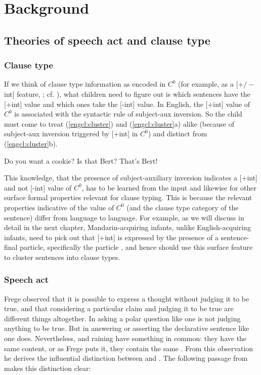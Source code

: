 \chapter{Background}
\label{chap:background}


\section{Theories of speech act and clause type} \label{sec:bg:theory}

\subsection{Clause type}
\label{sec:bg:clause}
If we think of clause type information as encoded in $C^{0}$ (for example, as a [$+/-$ int] feature,  \cite{chomskylasnik1977,rizzi1997}; cf. \cite{rizzi2001int}), what children need to figure out is which sentences have the [+int] value and which ones take the [-int] value. In English, the [+int] value of $C^{0}$ is associated with the syntactic rule of subject-aux inversion. So the child must come to treat (\ref{engcl:cluster}) and (\ref{engcl:cluster}a) alike (because of subject-aux inversion triggered by [+int] in $C^{0}$) and distinct from (\ref{engcl:cluster}b).%


Do you want a cookie?
\bxl{}
Is that Bert?
\ex
That’s Bert!
\exl
\eex

This knowledge, that the presence of subject-auxiliary inversion indicates a [+int] and not [-int] value of $C^{0}$, has to be learned from the input and likewise for other surface formal properties relevant for clause typing. This is because the relevant properties indicative of the value of $C^{0}$ (and the clause type category of the sentence) differ from language to language. For example, as we will discuss in detail in the next chapter, Mandarin-acquiring infants, unlike English-acquiring infants, need to pick out that [+int] is expressed by the presence of a sentence-final particle, specifically the particle , and hence should use this surface feature to cluster sentences into clause types.


\subsection{Speech act} \label{sec:bg:speech}
Frege observed that it is possible to express a thought without judging it to be true, and that considering a particular claim and judging it to be true are different things altogether. In asking a polar question like one is not judging anything to be true. But in answering or asserting the declarative sentence like  one does. Nevertheless,  and  raining have something in common: they have the same content, or as Frege puts it, they contain the same . From this observation he derives the influential distinction between  and . The following passage from  makes this distinction clear:

